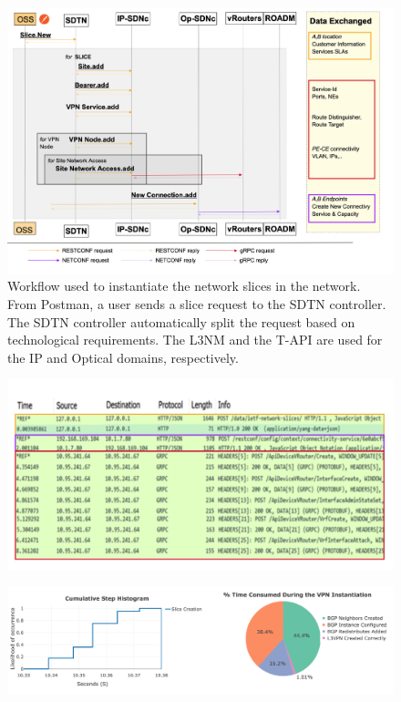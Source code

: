 \documentclass[journal,article,submit,moreauthors,pdftex]{Definitions/mdpi}
\begin{document}
\begin{figure}[htb]
\includegraphics[width=\linewidth]{Figs/slicecreation.png}
\caption{Workflow used to instantiate the network slices in the network. From Postman, a user sends a slice request to the SDTN controller. The SDTN controller automatically split the request based on technological requirements. The L3NM and the T-API are used for the IP and Optical domains, respectively.}
\label{fig:slicecreation}
\end{figure}

\begin{figure}[htb]
\includegraphics[width=\linewidth]{Figs/sliceworkflow2.png}
\caption{}
\label{fig:sliceworkflow2}
\end{figure}

\begin{figure}[htb]
\includegraphics[width=\linewidth]{Figs/sliceworkflow.png}
\caption{}
\label{fig:sliceworkflow}
\end{figure}
\end{document}
